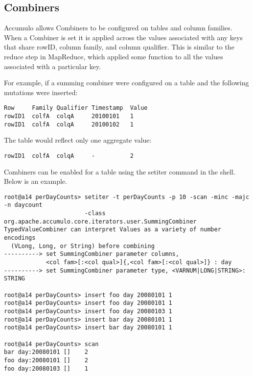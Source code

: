 \subsection{Combiners}

Accumulo allows Combiners to be configured on tables and column
families. When a Combiner is set it is applied across the values
associated with any keys that share rowID, column family, and column qualifier.
This is similar to the reduce step in MapReduce, which applied some function to all
the values associated with a particular key.

For example, if a summing combiner were configured on a table and the following
mutations were inserted:

\begingroup\fontsize{8pt}{8pt}\selectfont\begin{verbatim}
Row     Family Qualifier Timestamp  Value
rowID1  colfA  colqA     20100101   1
rowID1  colfA  colqA     20100102   1
\end{verbatim}\endgroup

The table would reflect only one aggregate value:

\begingroup\fontsize{8pt}{8pt}\selectfont\begin{verbatim}
rowID1  colfA  colqA     -          2
\end{verbatim}\endgroup

Combiners can be enabled for a table using the setiter command in the shell. Below is an example.

\begingroup\fontsize{8pt}{8pt}\selectfont\begin{verbatim}
root@a14 perDayCounts> setiter -t perDayCounts -p 10 -scan -minc -majc -n daycount 
                       -class org.apache.accumulo.core.iterators.user.SummingCombiner
TypedValueCombiner can interpret Values as a variety of number encodings 
  (VLong, Long, or String) before combining
----------> set SummingCombiner parameter columns, 
            <col fam>[:<col qual>]{,<col fam>[:<col qual>]} : day
----------> set SummingCombiner parameter type, <VARNUM|LONG|STRING>: STRING

root@a14 perDayCounts> insert foo day 20080101 1
root@a14 perDayCounts> insert foo day 20080101 1
root@a14 perDayCounts> insert foo day 20080103 1
root@a14 perDayCounts> insert bar day 20080101 1
root@a14 perDayCounts> insert bar day 20080101 1

root@a14 perDayCounts> scan
bar day:20080101 []    2
foo day:20080101 []    2
foo day:20080103 []    1
\end{verbatim}\endgroup

